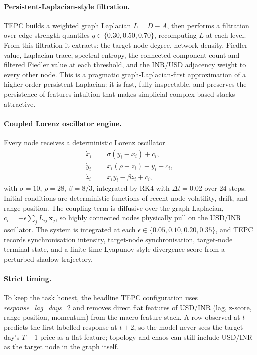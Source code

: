\documentclass[11pt]{article}
\begin{document}
\paragraph{Persistent-Laplacian-style filtration.}
TEPC builds a weighted graph Laplacian $L=D-A$, then performs a filtration over edge-strength quantiles $q\in\{0.30,0.50,0.70\}$, recomputing $L$ at each level. From this filtration it extracts: the target-node degree, network density, Fiedler value, Laplacian trace, spectral entropy, the connected-component count and filtered Fiedler value at each threshold, and the INR/USD adjacency weight to every other node. This is a pragmatic graph-Laplacian-first approximation of a higher-order persistent Laplacian: it is fast, fully inspectable, and preserves the persistence-of-features intuition that makes simplicial-complex-based stacks attractive.

\paragraph{Coupled Lorenz oscillator engine.}
Every node receives a deterministic Lorenz oscillator
\begin{equation}
\begin{aligned}
\dot{x}_i &= \sigma(y_i - x_i) + c_i,\\
\dot{y}_i &= x_i(\rho - z_i) - y_i + c_i,\\
\dot{z}_i &= x_i y_i - \beta z_i + c_i,
\end{aligned}
\end{equation}
with $\sigma=10$, $\rho=28$, $\beta=8/3$, integrated by RK4 with $\Delta t=0.02$ over 24 steps. Initial conditions are deterministic functions of recent node volatility, drift, and range position. The coupling term is diffusive over the graph Laplacian, $c_i=-\epsilon\sum_j L_{ij}\,\mathbf{x}_j$, so highly connected nodes physically pull on the USD/INR oscillator. The system is integrated at each $\epsilon\in\{0.05,0.10,0.20,0.35\}$, and TEPC records synchronisation intensity, target-node synchronisation, target-node terminal state, and a finite-time Lyapunov-style divergence score from a perturbed shadow trajectory.

\paragraph{Strict timing.}
To keep the task honest, the headline TEPC configuration uses \textit{response\_lag\_days}=2 and removes direct flat features of USD/INR (lag, z-score, range-position, momentum) from the macro feature stack. A row observed at $t$ predicts the first labelled response at $t+2$, so the model never sees the target day's $T-1$ price as a flat feature; topology and chaos can still include USD/INR as the target node in the graph itself.
\end{document}
